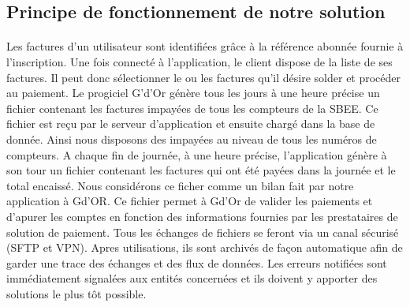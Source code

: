   \subsection{Principe de fonctionnement de notre solution}
      \paragraph{}
	  
	  \paragraph{}
	  	Les factures d'un utilisateur sont identifi\'ees gr\^ace \`a la r\'ef\'erence abonn\'ee fournie \`a l'inscription. Une fois connect\'e \`a l'application, le client dispose de la liste de ses factures. Il peut donc s\'electionner le ou les factures qu'il d\'esire solder et proc\'eder au paiement. Le progiciel G'd'Or g\'en\`ere tous les jours \`a une heure pr\'ecise un fichier contenant les factures impay\'ees de tous les compteurs de la SBEE. Ce fichier est reçu par le serveur d'application et ensuite charg\'e dans la  base de donn\'ee. Ainsi nous disposons des impay\'ees au niveau de tous les num\'eros de compteurs. A chaque fin de journ\'ee, \`a une heure pr\'ecise, l'application g\'en\`ere \`a son tour un fichier contenant les factures qui ont \'et\'e pay\'ees dans la journ\'ee et le total encaiss\'e. Nous consid\'erons ce ficher comme un bilan fait par notre application \`a Gd'OR. Ce fichier permet \`a Gd'Or de valider les paiements et d'apurer les comptes en fonction des informations fournies par les prestataires de solution de paiement. Tous les \'echanges de fichiers se feront via un canal s\'ecuris\'e (SFTP et VPN). Apres utilisations, ils sont archiv\'es de façon automatique afin de garder une trace des \'echanges et des flux de donn\'ees. Les erreurs notifi\'ees sont imm\'ediatement signal\'ees aux entit\'es concern\'ees et ils doivent y apporter des solutions le plus t\^ot possible. 
	  	
